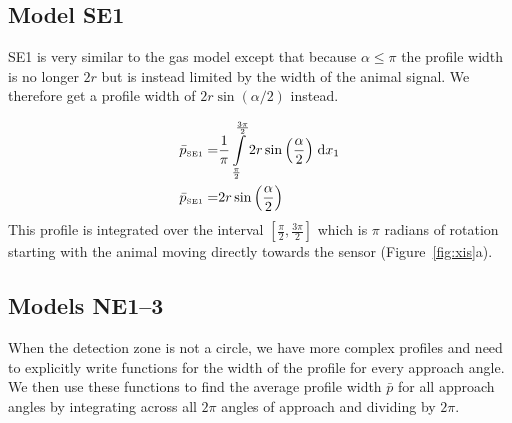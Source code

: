\subsection{Model SE1} \label{SE1}
SE1 is very similar to the gas model except that because $\alpha \le \pi$ the profile width is no longer $2r$ but is instead limited by the width of the animal signal.
We therefore get a profile width of $2r\sin(\alpha/2)$ instead.

\begin{align}
    \bar{p}_{\text{\tiny{SE1}}} =&\frac{1}{\pi} \int\limits_{\frac{\pi}{2}}^{\frac{3 \pi}{2}}2 r \sin{\left (\frac{\alpha}{2} \right )}\;\mathrm{d}x_{1}\label{pSE1Def}\\
    \bar{p}_{\text{\tiny{SE1}}}  =& 2 r \sin{\left (\frac{\alpha}{2} \right )}\label{pSE1Sln}
\end{align}
This profile is integrated over the interval $[\frac{\pi}{2}, \frac{3\pi}{2}]$ which is $\pi$ radians of rotation starting with the animal moving directly towards the sensor (Figure~\ref{fig:xis}a).

\subsection{ Models NE1--3} \label{NE}

When the detection zone is not a circle, we have more complex profiles  and need to explicitly write functions for the width of the profile for every approach angle.
We then use these functions to find the average profile width $\bar{p}$ for all approach angles by integrating across all $2\pi$ angles of approach and dividing by $2\pi$.





